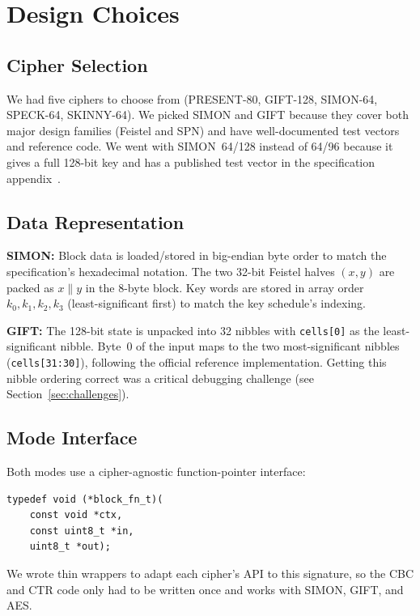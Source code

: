 \documentclass[conference]{IEEEtran}
\begin{document}
\section{Design Choices}

\subsection{Cipher Selection}

We had five ciphers to choose from (PRESENT-80, GIFT-128, SIMON-64,
SPECK-64, SKINNY-64).  We picked SIMON and GIFT because they cover both
major design families (Feistel and SPN) and have well-documented test
vectors and reference code.  We went with SIMON~64/128 instead of 64/96
because it gives a full 128-bit key and has a published test vector in
the specification appendix~\cite{beaulieu2013simon}.

\subsection{Data Representation}

\textbf{SIMON:} Block data is loaded/stored in big-endian byte order to
match the specification's hexadecimal notation.  The two 32-bit Feistel
halves $(x, y)$ are packed as $x \| y$ in the 8-byte block.  Key words are
stored in array order $k_0, k_1, k_2, k_3$ (least-significant first) to
match the key schedule's indexing.

\textbf{GIFT:} The 128-bit state is unpacked into 32 nibbles with
\texttt{cells[0]} as the least-significant nibble.  Byte~0 of the input
maps to the two most-significant nibbles (\texttt{cells[31:30]}), following
the official reference implementation.  Getting this nibble ordering correct
was a critical debugging challenge (see Section~\ref{sec:challenges}).

\subsection{Mode Interface}

Both modes use a cipher-agnostic function-pointer interface:
\begin{lstlisting}
typedef void (*block_fn_t)(
    const void *ctx,
    const uint8_t *in,
    uint8_t *out);
\end{lstlisting}
We wrote thin wrappers to adapt each cipher's API to this signature,
so the CBC and CTR code only had to be written once and works with
SIMON, GIFT, and AES.
\end{document}
